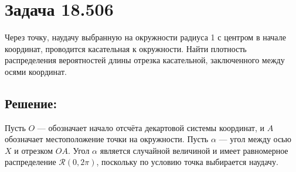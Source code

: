 \begin{comment}
\subsection*{Ответ:}
\begin{enumerate}
    \item
    $
    f_Y(y)
    = \left \{
    \begin{array}{ll}
        0 ,                            & y < 0   \\
        2 \lambda y e^{- \lambda y^2}, & 0 \le y
    \end{array}
    \right .
    ,
    $
    \item
    $
    f_Z(z)
    = \left \{
    \begin{array}{ll}
        0,                                                   & z < 0   \\
        \lambda \frac{1}{2 \sqrt{z}} e^{- \lambda \sqrt{z}}, & 0 \le z
    \end{array}
    \right .
    ,
    $
    \item
    $
    f_U(u)
    = \left \{
    \begin{array}{ll}
        0,  & u \le 0   \\
        1 , & 0 < u < 1 \\
        0,  & 1 \le u
    \end{array}
    \right .
    .
    $
\end{enumerate}
\end{comment}

\section*{Задача 18.506}

Через точку, наудачу выбранную на окружности радиуса 1 с центром в начале координат, проводится касательная к окружности. Найти плотность распределения вероятностей
длины отрезка касательной, заключенного между осями координат.

\subsection*{Решение:}
Пусть $O$ --- обозначает начало отсчёта декартовой системы координат, и $A$ обозначает местоположение точки на окружности. Пусть $\alpha$ --- угол между осью $X$ и
отрезком $OA$. Угол $\alpha$ является случайной величиной и имеет равномерное распределение $\mathcal{R}(0, 2 \pi)$, поскольку по условию точка выбирается наудачу.

